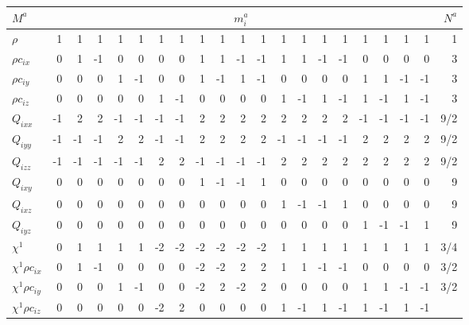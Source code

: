 \begin{table}[t]
\centering
\tabcolsep=4pt
\begin{tabular}{|l||r|rrrrrr|rrrr|rrrr|rrrr|r||}
\hline\hline
$M^a$ & \multicolumn{19}{c||}{$m_i^a$} & $N^a$\\
\hline
$\rho $ & 1 &  1 &  1 &  1 &  1 &  1 &  1 & 
         1 &  1 &  1 &   1 &  1 &  1 &  1 & 1 & 1 & 1 & 1 & 1
& 1\\
\hline
$\rho c_{ix}$ & 0 &  1 &  -1 &  0 &  0 &  0 &  0 & 
         1 &  1 &  -1 &   -1 &  1 &  1 &  -1 & -1 & 0 & 0 & 0 & 0
& 3 \\
\hline
$\rho c_{iy}$ & 0 &  0 &  0 &  1 &  -1 &  0 &  0 & 
         1 &  -1 &  1 &   -1 &  0 &  0 &  0 & 0 & 1 & 1 & -1 & -1
& 3\\
\hline
$\rho c_{iz}$ & 0 &  0 &  0 &  0 &  0 &  1 &  -1 & 
         0 &  0 &  0 &   0 &  1 &  -1 &  1 & -1 & 1 & -1 & 1 & -1
& 3\\
\hline
$Q_{ixx}$ & -1 &  2 &  2 &  -1&  -1 &  -1 &  -1 & 
         2 &  2 &  2 &   2 &  2 &  2 &  2 & 2 & -1 & -1 & -1 & -1
& 9/2\\
\hline
$Q_{iyy}$ & -1 &  -1 &  -1 &  2&  2 &  -1 &  -1 & 
         2 &  2 &  2 &   2 &  -1 &  -1 &  -1 & -1 & 2 & 2 & 2 & 2
& 9/2\\
\hline
$Q_{izz}$ & -1 &  -1 &  -1 &  -1&  -1 &  2 &  2 & 
         -1 &  -1 &  -1 &   -1 &  2 &  2 & 2 & 2 & 2 & 2 & 2 & 2
& 9/2\\
\hline
$Q_{ixy}$ & 0 &  0 &  0 &  0&  0 &  0 &  0 & 
          1 &  -1 &  -1 &    1 &  0 &  0 & 0 & 0 & 0 & 0 & 0 & 0
& 9\\
\hline
$Q_{ixz}$ & 0 &  0 &  0 &  0&  0 &  0 &  0 & 
          0 &   0 &   0 &   0 &  1 & -1 & -1 & 1 & 0 & 0 & 0 & 0
& 9\\
\hline
$Q_{iyz}$ & 0 &  0 &  0 &  0&  0 &  0 &  0 & 
          0 &   0 &   0 &   0 &  0 & 0 & 0 & 0 & 1 & -1 & -1 & 1
& 9\\
\hline\hline
$\chi^1$ & 0 &  1 &  1 &  1 &  1 &  -2 &  -2 & 
         -2 &  -2 &  -2 &  -2 &  1 &  1 & 1 & 1 & 1 & 1 & 1 & 1
& 3/4\\
\hline
$\chi^1 \rho c_{ix}$ & 0 &  1 &  -1 &  0&  0 &  0 &  0 & 
         -2 &  -2 &  2 &  2 &  1 &  1 & -1 & -1 & 0 & 0 & 0 & 0
& 3/2\\
\hline
$\chi^1 \rho c_{iy}$ & 0 &  0 &  0 &  1&  -1 &  0 &  0 & 
         -2 &  2 &  -2 &  2 &  0 &  0 & 0 & 0 & 1 & 1 & -1 & -1
& 3/2\\
\hline
$\chi^1 \rho c_{iz}$ & 0 &  0 &  0 &  0&  0 &  -2 &  2 & 
         0 &  0 &  0 &  0 &  1 &  -1 & 1 & -1 & 1 & -1 & 1 & -1

\end{tabular}
\end{table}
